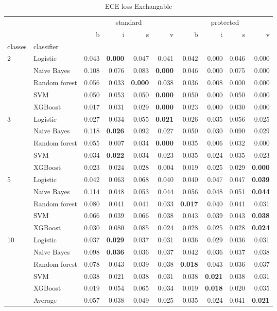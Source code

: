 \begin{table}
\caption{ECE loss Exchangable}
\begin{tabular}{l|l|rrrr|rrrr}
\toprule
 &  & \multicolumn{4}{c}{standard} & \multicolumn{4}{c}{protected} \\
 &  & b & i & s & v & b & i & s & v \\
classes & classifier &  &  &  &  &  &  &  &  \\
\midrule
\midrule
\multirow[c]{5}{*}{2} & Logistic & 0.043 & \textbf{0.000} & 0.047 & 0.041 & 0.042 & 0.000 & 0.046 & 0.000 \\
 & Naive Bayes & 0.108 & 0.076 & 0.083 & \textbf{0.000} & 0.046 & 0.000 & 0.075 & 0.000 \\
 & Random forest & 0.056 & 0.033 & \textbf{0.000} & 0.038 & 0.036 & 0.008 & 0.000 & 0.000 \\
 & SVM & 0.050 & 0.053 & 0.050 & \textbf{0.000} & 0.050 & 0.000 & 0.050 & 0.000 \\
 & XGBoost & 0.017 & 0.031 & 0.029 & \textbf{0.000} & 0.023 & 0.000 & 0.030 & 0.000 \\
\midrule
\multirow[c]{5}{*}{3} & Logistic & 0.027 & 0.034 & 0.055 & \textbf{0.021} & 0.026 & 0.035 & 0.056 & 0.025 \\
 & Naive Bayes & 0.118 & \textbf{0.026} & 0.092 & 0.027 & 0.050 & 0.030 & 0.090 & 0.029 \\
 & Random forest & 0.055 & 0.007 & 0.034 & \textbf{0.000} & 0.035 & 0.006 & 0.032 & 0.000 \\
 & SVM & 0.034 & \textbf{0.022} & 0.034 & 0.023 & 0.035 & 0.024 & 0.035 & 0.023 \\
 & XGBoost & 0.023 & 0.024 & 0.028 & 0.004 & 0.019 & 0.025 & 0.029 & \textbf{0.000} \\
\midrule
\multirow[c]{5}{*}{5} & Logistic & 0.042 & 0.063 & 0.068 & 0.040 & 0.040 & 0.047 & 0.047 & \textbf{0.039} \\
 & Naive Bayes & 0.114 & 0.048 & 0.053 & 0.044 & 0.056 & 0.048 & 0.051 & \textbf{0.044} \\
 & Random forest & 0.080 & 0.041 & 0.041 & 0.033 & \textbf{0.017} & 0.040 & 0.041 & 0.031 \\
 & SVM & 0.066 & 0.039 & 0.066 & 0.038 & 0.043 & 0.039 & 0.043 & \textbf{0.038} \\
 & XGBoost & 0.030 & 0.080 & 0.085 & 0.024 & 0.028 & 0.025 & 0.028 & \textbf{0.024} \\
\midrule
\multirow[c]{5}{*}{10} & Logistic & 0.037 & \textbf{0.029} & 0.037 & 0.031 & 0.036 & 0.029 & 0.036 & 0.031 \\
 & Naive Bayes & 0.098 & \textbf{0.036} & 0.036 & 0.037 & 0.042 & 0.036 & 0.037 & 0.038 \\
 & Random forest & 0.078 & 0.043 & 0.039 & 0.038 & \textbf{0.018} & 0.043 & 0.036 & 0.037 \\
 & SVM & 0.038 & 0.021 & 0.038 & 0.031 & 0.038 & \textbf{0.021} & 0.038 & 0.031 \\
 & XGBoost & 0.019 & 0.054 & 0.065 & 0.034 & 0.019 & \textbf{0.018} & 0.020 & 0.035 \\\midrule\ & Average & 0.057 & 0.038 & 0.049 & 0.025 & 0.035 & 0.024 & 0.041 & \textbf{0.021} \\
\bottomrule
\end{tabular}
\end{table}
